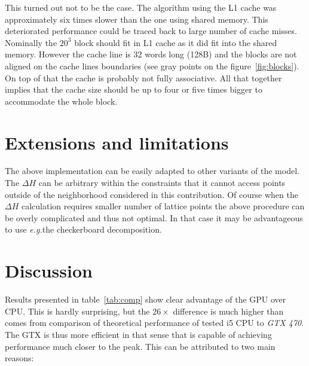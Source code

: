 \documentclass[a4paper]{llncs}
\newcommand{\eg}{\textit{e.g.}}
\begin{document}
This turned out not to be the case. The algorithm using the L1 cache was
approximately six times slower than the one using shared memory. This
deteriorated performance could be traced back to large number of cache misses.
Nominally the $20^3$ block should fit in L1 cache as it did fit into the shared
memory. However the cache line is 32 words long (128B) and the blocks are not
aligned on the cache lines boundaries (see gray points on the
figure~\ref{fig:blocks}). On top of that the cache is probably not fully
associative. All that together implies that the cache size should be up to four
or five times bigger to accommodate the whole block.


\section{Extensions and limitations}

The above implementation can be easily adapted to other variants of the model.
The $\Delta H$ can be arbitrary within the constraints that it cannot access
points outside of the neighborhood considered in this contribution. Of course
when the $\Delta H$ calculation requires smaller number of lattice points the
above procedure can be overly complicated and thus not optimal. In that case it
may be advantageous to use \eg the checkerboard decomposition.


\section{Discussion}

Results presented in table~\ref{tab:comp} show clear advantage of the GPU over
CPU. This is hardly surprising, but the $26\times$ difference is much higher
than comes from comparison of theoretical performance of tested i5 CPU to
\emph{GTX 470}. The GTX is thus more efficient in that sense that is capable of
achieving performance much closer to the peak. This can be attributed to two
main reasons:
\end{document}
